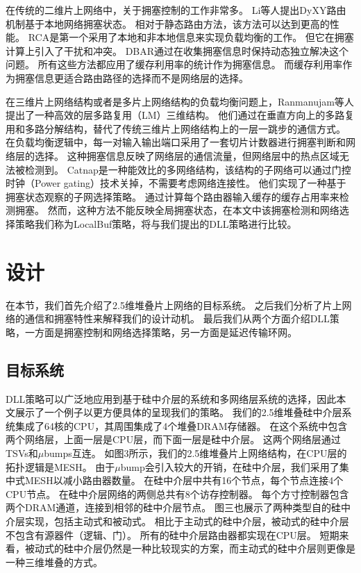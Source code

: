在传统的二维片上网络中，关于拥塞控制的工作非常多。
Li等人提出DyXY路由机制基于本地网络拥塞状态。
相对于静态路由方法，该方法可以达到更高的性能。
RCA是第一个采用了本地和非本地信息来实现负载均衡的工作。
但它在拥塞计算上引入了干扰和冲突。
DBAR通过在收集拥塞信息时保持动态独立解决这个问题。
所有这些方法都应用了缓存利用率的统计作为拥塞信息。
而缓存利用率作为拥塞信息更适合路由路径的选择而不是网络层的选择。

在三维片上网络结构或者是多片上网络结构的负载均衡问题上，Ranmanujam等人提出了一种高效的层多路复用（LM）三维结构。
他们通过在垂直方向上的多路复用和多路分解结构，替代了传统三维片上网络结构上的一层一跳步的通信方式。
在负载均衡逻辑中，每一对输入输出端口采用了一套切片计数器进行拥塞判断和网络层的选择。
这种拥塞信息反映了网络层的通信流量，但网络层中的热点区域无法被检测到。
Catnap是一种能效比的多网络结构，该结构的子网络可以通过门控时钟（Power gating）技术关掉，不需要考虑网络连接性。
他们实现了一种基于拥塞状态观察的子网选择策略。
通过计算每个路由器输入缓存的缓存占用率来检测拥塞。
然而，这种方法不能反映全局拥塞状态，在本文中该拥塞检测和网络选择策略我们称为LocalBuf策略，将与我们提出的DLL策略进行比较。


\section{设计}

在本节，我们首先介绍了2.5维堆叠片上网络的目标系统。
之后我们分析了片上网络的通信和拥塞特性来解释我们的设计动机。
最后我们从两个方面介绍DLL策略，一方面是拥塞控制和网络选择策略，另一方面是延迟传输环网。

\subsection{目标系统}

DLL策略可以广泛地应用到基于硅中介层的系统和多网络层系统的选择，因此本文展示了一个例子以更方便具体的呈现我们的策略。
我们的2.5维堆叠硅中介层系统集成了64核的CPU，其周围集成了4个堆叠DRAM存储器。
在这个系统中包含两个网络层，上面一层是CPU层，而下面一层是硅中介层。
这两个网络层通过TSVs和$\mu$bumps互连。
如图3所示，我们的2.5维堆叠片上网络结构，在CPU层的拓扑逻辑是MESH。
由于$\mu$bump会引入较大的开销，在硅中介层，我们采用了集中式MESH以减小路由器数量。
在硅中介层中共有16个节点，每个节点连接4个CPU节点。
在硅中介层网络的两侧总共有8个访存控制器。
每个方寸控制器包含两个DRAM通道，连接到相邻的硅中介层节点。
图三也展示了两种类型自的硅中介层实现，包括主动式和被动式。
相比于主动式的硅中介层，被动式的硅中介层不包含有源器件（逻辑、门）。
所有的硅中介层路由器都实现在CPU层。
短期来看，被动式的硅中介层仍然是一种比较现实的方案，而主动式的硅中介层则更像是一种三维堆叠的方式。

